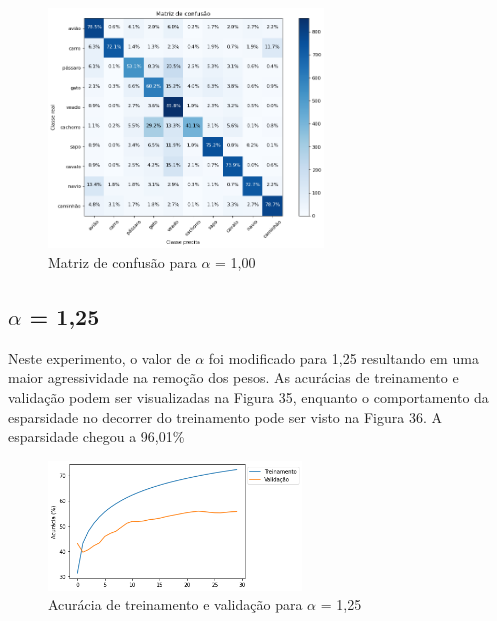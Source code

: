 \begin{figure}[H]
	\includegraphics[width=0.65\textwidth, keepaspectratio=true]{figuras/CAP4/cm10_.png}
	\centering
	\caption[Matriz de confusão para $\alpha$ = 1,00]{Matriz de confusão para $\alpha$ = 1,00}
\end{figure}


\subsection{$\alpha$ = 1,25}
Neste experimento, o valor de $\alpha$ foi modificado para 1,25 resultando em uma maior agressividade na remoção dos pesos. As acurácias de treinamento e validação podem ser visualizadas na Figura 35, enquanto o comportamento da esparsidade no decorrer do treinamento pode ser visto na Figura 36. A esparsidade chegou a 96,01\%



\begin{figure}[H]
	\includegraphics[width=0.6\textwidth, keepaspectratio=true]{figuras/CAP4/acuracia125.png}
	\centering
	\caption[Acurácia de treinamento e validação para $\alpha$ = 1,25]{Acurácia de treinamento e validação para $\alpha$ = 1,25}
\end{figure}

